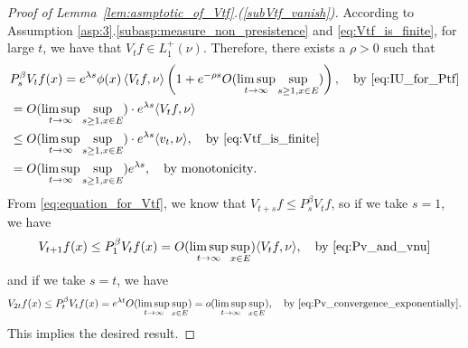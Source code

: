 \documentclass[12pt,a4paper]{amsart}
\numberwithin{equation}{section}
\theoremstyle{plain}
\theoremstyle{definition}
\begin{document}
\begin{proof}[Proof of Lemma~\ref{lem:asmptotic_of_Vtf}.(\ref{subVtf_vanish})]
According to Assumption \ref{asp:3}.\eqref{subasp:measure_non_presistence} and \eqref{eq:Vtf_is_finite}, for large $t$, we have that $V_tf \in L^+_1(\nu)$.
Therefore, there exists a $\rho > 0$ such that
\begin{align}
  &P_s^\beta V_t f(x) = e^{\lambda s} \phi(x) \left\langle V_tf, \nu \right\rangle \left (1+e^{-\rho s}O(\limsup_{t\to \infty}\sup_{s\geq 1,x\in E})\right),\quad\text{by~\eqref{eq:IU_for_Ptf}} \label{eq:asmptotic_for_PsVtf}
  \\&= O(\limsup_{t\to \infty}\sup_{s\geq 1, x\in E}) \cdot e^{\lambda s} \langle V_tf,\nu \rangle \label{eq:Pv_and_vnu}
  \\&\leq O(\limsup_{t\to \infty} \sup_{s\geq 1, x\in E}) \cdot e^{\lambda s} \langle v_t,\nu\rangle,\quad\text{by~\eqref{eq:Vtf_is_finite}}
  \\&= O(\limsup_{t\to \infty}\sup_{s\geq 1, x\in E}) e^{\lambda s},\quad\text{by~monotonicity}. \label{eq:Pv_convergence_exponentially}
\end{align}
From \eqref{eq:equation_for_Vtf}, we know that $V_{t+s} f \leq P_s^\beta V_t f$, so if we take $s = 1$, we have
\begin{align}
\label{eq:VtPlusOnef_leq_Vtfnu}
V_{t+1}f(x) \leq P_1^\beta V_t f(x) = O(\limsup_{t
  \to \infty}\sup_{x\in E}) \langle V_tf,\nu\rangle,\quad\text{by~\eqref{eq:Pv_and_vnu}} 
\end{align}
and if we take $s = t$, we have
\begin{align}
\label{eq:Vtf_convergence_to_zero}
V_{2t}f(x) 
\leq P_t^\beta V_tf(x)
= e^{\lambda t} O(\limsup_{t\to \infty} \sup_{x\in E})
  = o(\limsup_{t\to \infty} \sup_{x\in E}),\quad\text{by~\eqref{eq:Pv_convergence_exponentially}}.
\end{align}
This implies the desired result.
\end{proof}
\end{document}
